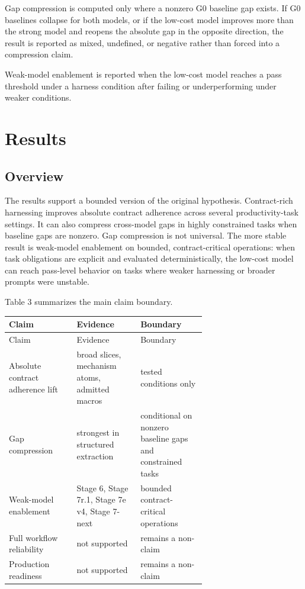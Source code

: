 \documentclass[11pt]{article}
\begin{document}
Gap compression is computed only where a nonzero G0 baseline gap exists. If G0 baselines collapse for both models, or if the low-cost model improves more than the strong model and reopens the absolute gap in the opposite direction, the result is reported as mixed, undefined, or negative rather than forced into a compression claim.

Weak-model enablement is reported when the low-cost model reaches a pass threshold under a harness condition after failing or underperforming under weaker conditions.

\section{Results}

\subsection{Overview}

The results support a bounded version of the original hypothesis. Contract-rich harnessing improves absolute contract adherence across several productivity-task settings. It can also compress cross-model gaps in highly constrained tasks when baseline gaps are nonzero. Gap compression is not universal. The more stable result is weak-model enablement on bounded, contract-critical operations: when task obligations are explicit and evaluated deterministically, the low-cost model can reach pass-level behavior on tasks where weaker harnessing or broader prompts were unstable.

Table 3 summarizes the main claim boundary.

{\small
\setlength{\tabcolsep}{3pt}
\begin{longtable}{>{\raggedright\arraybackslash}p{0.220\linewidth}>{\raggedright\arraybackslash}p{0.220\linewidth}>{\raggedright\arraybackslash}p{0.220\linewidth}}
\toprule
Claim & Evidence & Boundary \\
\midrule
\endfirsthead
\toprule
Claim & Evidence & Boundary \\
\midrule
\endhead
Absolute contract adherence lift & broad slices, mechanism atoms, admitted macros & tested conditions only \\
Gap compression & strongest in structured extraction & conditional on nonzero baseline gaps and constrained tasks \\
Weak-model enablement & Stage 6, Stage 7r.1, Stage 7e v4, Stage 7-next & bounded contract-critical operations \\
Full workflow reliability & not supported & remains a non-claim \\
Production readiness & not supported & remains a non-claim \\
\bottomrule
\end{longtable}
}
\end{document}
